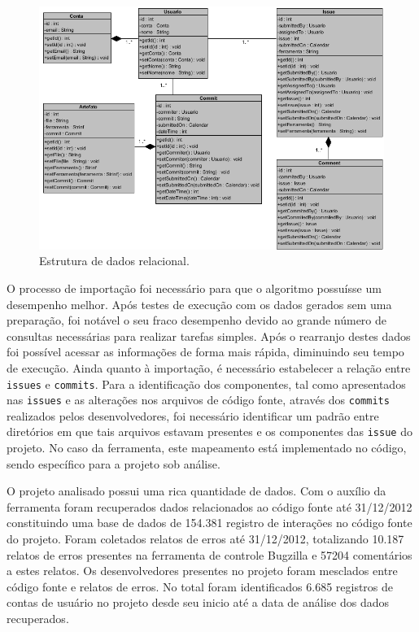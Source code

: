 \documentclass[oneside,brazil,a4paper]{normas-utf-tex}
\begin{document}
\begin{figure}[hbt]
    \centering
    \includegraphics[width=.95\textwidth]{figuras/diagramaF}
    \caption{Estrutura de dados relacional.}
    \label{fig:diagE}
\end{figure}

O processo de importação foi necessário para que o algoritmo possuísse um desempenho melhor. Após testes de execução com os dados gerados sem uma preparação, foi notável o seu fraco desempenho devido ao grande número de consultas necessárias para realizar tarefas simples. Após o rearranjo destes dados foi possível acessar as informações de forma mais rápida, diminuindo seu tempo de execução. Ainda quanto à importação, é necessário estabelecer a relação entre \texttt{issues} e \texttt{commits}. Para a identificação dos componentes, tal como apresentados nas \texttt{issues} e as alterações nos arquivos de código fonte, através dos \texttt{commits} realizados pelos desenvolvedores, foi necessário identificar um padrão entre diretórios em que tais arquivos estavam presentes e os componentes das \texttt{issue} do projeto. No caso da ferramenta, este mapeamento está implementado no código, sendo específico para a projeto sob análise.

O projeto analisado possui uma rica quantidade de dados. Com o auxílio da ferramenta foram recuperados dados relacionados ao código fonte até 31/12/2012 constituindo uma base de dados de 154.381 registro de interações no código fonte do projeto. Foram coletados relatos de erros até 31/12/2012, totalizando 10.187 relatos de erros presentes na ferramenta de controle Bugzilla e 57204 comentários a estes relatos.  Os desenvolvedores presentes no projeto foram mesclados entre código fonte e relatos de erros. No total foram identificados 6.685 registros de contas de usuário no projeto desde seu inicio até a data de análise dos dados recuperados.
\end{document}
